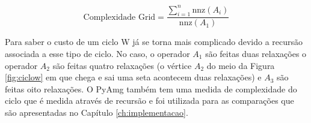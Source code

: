 \begin{equation}\label{eq:complexidadegrid}
    \text{Complexidade Grid} = \frac{\sum_{i=1}^n \text{nnz}(A_i)}{\text{nnz}(A_1)}
\end{equation}

Para saber o custo de um ciclo W já se torna mais complicado devido a recursão associada a esse tipo de ciclo. No caso, o operador $A_1$ são feitas duas relaxações o operador $A_2$ são feitas quatro relaxações (o vértice $A_2$ do meio da Figura \ref{fig:ciclow} em que chega e sai uma seta acontecem duas relaxações) e $A_3$ são feitas oito relaxações. O PyAmg também tem uma medida de complexidade do ciclo que é medida através de recursão e foi utilizada para as comparações que são apresentadas no Capítulo \ref{ch:implementacao}. 







